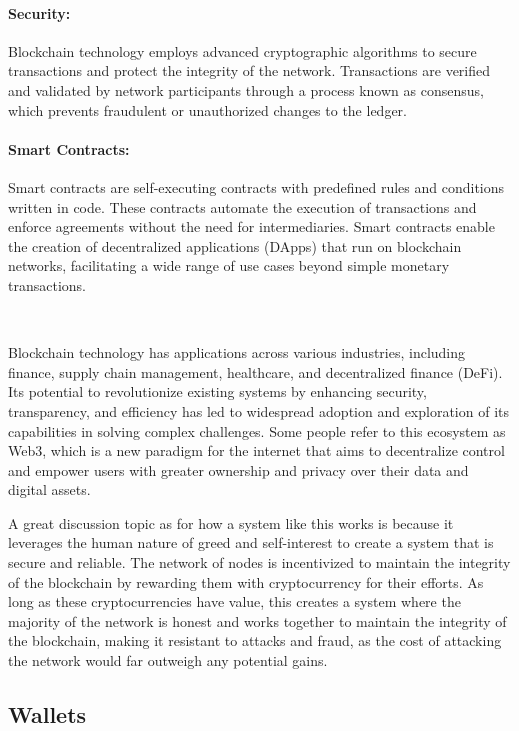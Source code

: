 \paragraph{Security:}
Blockchain technology employs advanced cryptographic algorithms to secure transactions and protect the integrity of the network. Transactions are verified and validated by network participants through a process known as consensus, which prevents fraudulent or unauthorized changes to the ledger.

\paragraph{Smart Contracts:}
Smart contracts are self-executing contracts with predefined rules and conditions written in code. These contracts automate the execution of transactions and enforce agreements without the need for intermediaries. Smart contracts enable the creation of decentralized applications (DApps) that run on blockchain networks, facilitating a wide range of use cases beyond simple monetary transactions.

~

Blockchain technology has applications across various industries, including finance, supply chain management, healthcare, and decentralized finance (DeFi). Its potential to revolutionize existing systems by enhancing security, transparency, and efficiency has led to widespread adoption and exploration of its capabilities in solving complex challenges. Some people refer to this ecosystem as Web3, which is a new paradigm for the internet that aims to decentralize control and empower users with greater ownership and privacy over their data and digital assets.

A great discussion topic as for how a system like this works is because it leverages the human nature of greed and self-interest to create a system that is secure and reliable. The network of nodes is incentivized to maintain the integrity of the blockchain by rewarding them with cryptocurrency for their efforts. As long as these cryptocurrencies have value, this creates a system where the majority of the network is honest and works together to maintain the integrity of the blockchain, making it resistant to attacks and fraud, as the cost of attacking the network would far outweigh any potential gains.

\subsection{Wallets}
\label{subsec:wallets}

